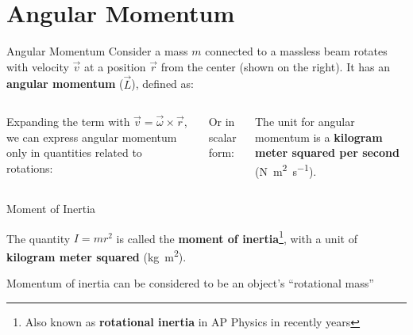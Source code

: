 \documentclass[12pt,compress,aspectratio=169]{beamer}
\begin{document}
\section{Angular Momentum}

\begin{frame}{Angular Momentum}
  Consider a mass $m$ connected to a massless beam rotates with velocity
  $\vec v$ at a position $\vec r$ from the center (shown on the right). It has
  an \textbf{angular momentum} ($\vec L$), defined as:
  \begin{columns}
    

    \vspace{-.1in}Expanding the term with $\vec v=\vec\omega\times\vec r$, we
    can express angular momentum only in quantities related to rotations:

    
    \vspace{-.2in}Or in scalar form:
    

    \vspace{-.2in}The unit for angular momentum is a
    \textbf{kilogram meter squared per second}
    (\si{\newton\metre\squared\per\second}).
    
  \end{columns}
\end{frame}



\begin{frame}{Moment of Inertia}
    
    
  The quantity $I=mr^2$ is called the \textbf{moment of inertia}\footnote{Also
  known as \textbf{rotational inertia} in AP Physics in recently years}, with
  a unit of \textbf{kilogram meter squared} (\si{\kilo\gram\metre\squared}).


  \vspace{-.15in}Momentum of inertia can be considered to be an object's
  ``rotational mass''
  \vspace{.3in}
\end{frame}
\end{document}
